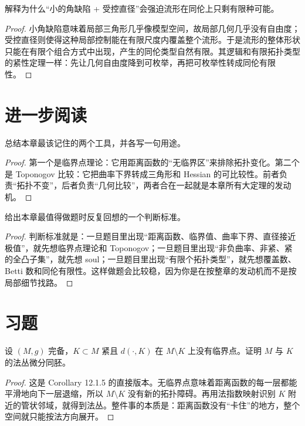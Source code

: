 \documentclass[11pt,a4paper,openany]{ctexbook}
\numberwithin{equation}{chapter}
\begin{document}
\begin{problem}
解释为什么“小的角缺陷 + 受控直径”会强迫流形在同伦上只剩有限种可能。
\end{problem}
\begin{proof}
小角缺陷意味着局部三角形几乎像模型空间，故局部几何几乎没有自由度；受控直径则使得这种局部控制能在有限尺度内覆盖整个流形。于是流形的整体形状只能在有限个组合方式中出现，产生的同伦类型自然有限。其逻辑和有限拓扑类型的紧性定理一样：先让几何自由度降到可枚举，再把可枚举性转成同伦有限性。  
\end{proof}

\section{进一步阅读}

\begin{problem}
总结本章最该记住的两个工具，并各写一句用途。
\end{problem}
\begin{proof}
第一个是临界点理论：它用距离函数的“无临界区”来排除拓扑变化。第二个是 Toponogov 比较：它把曲率下界转成三角形和 Hessian 的可比较性。前者负责“拓扑不变”，后者负责“几何比较”，两者合在一起就是本章所有大定理的发动机。  
\end{proof}

\begin{problem}
给出本章最值得做题时反复回想的一个判断标准。
\end{problem}
\begin{proof}
判断标准就是：一旦题目里出现“距离函数、临界值、曲率下界、直径接近极值”，就先想临界点理论和 Toponogov；一旦题目里出现“非负曲率、非紧、紧的全凸子集”，就先想 soul；一旦题目里出现“有限个拓扑类型”，就先想覆盖数、Betti 数和同伦有限性。这样做题会比较稳，因为你是在按整章的发动机而不是按局部细节找路。  
\end{proof}

\section{习题}

\begin{exercise}
设 \((M,g)\) 完备，\(K\subset M\) 紧且 \(d(\cdot,K)\) 在 \(M\setminus K\) 上没有临界点。证明 \(M\) 与 \(K\) 的法丛微分同胚。
\end{exercise}
\begin{proof}
这是 Corollary 12.1.5 的直接版本。无临界点意味着距离函数的每一层都能平滑地向下一层退缩，所以 \(M\setminus K\) 没有新的拓扑障碍。再用法指数映射识别 \(K\) 附近的管状邻域，就得到法丛。整件事的本质是：距离函数没有“卡住”的地方，整个空间就只能按法方向展开。  
\end{proof}
\end{document}
